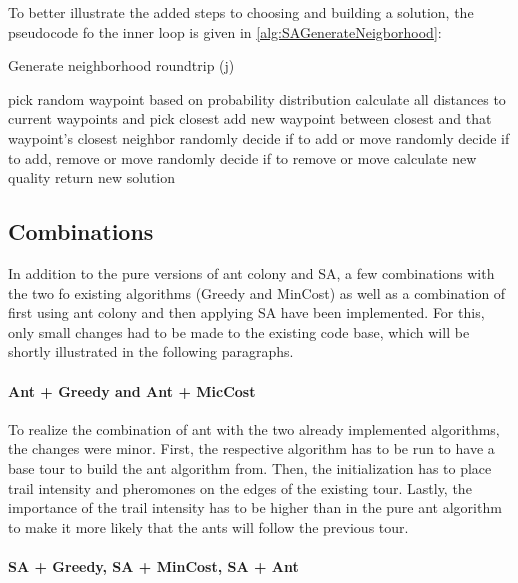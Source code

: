 To better illustrate the added steps to choosing and building a solution, the pseudocode fo the inner loop is given in \ref{alg:SAGenerateNeigborhood}:



\begin{breakablealgorithm}
	\caption{Generate neighborhood roundtrip (j)}
	\label{alg:SAGenerateNeigborhood}
	\begin{algorithmic}[1]
		\STATE pick random waypoint based on probability distribution
		\STATE calculate all distances to current waypoints and pick closest
		\STATE add new waypoint between closest and that waypoint's closest neighbor
		\ELSE {}
		\STATE randomly decide if to add or move
		\ELSE {}
		\STATE randomly decide if to add, remove or move
		\ELSE 
		\STATE randomly decide if to remove or move
		\ENDIF
		\ENDIF
		\ENDIF
		\STATE calculate new quality
		\STATE return new solution
	\end{algorithmic}
\end{breakablealgorithm}


\subsection{Combinations}
\label{subsec:algoCombinations}

In addition to the pure versions of ant colony and SA, a few combinations with the two fo existing algorithms (Greedy and MinCost) as well as a combination of first using ant colony and then applying SA have been implemented.
For this, only small changes had to be made to the existing code base, which will be shortly illustrated in the following paragraphs.

\paragraph{Ant + Greedy and Ant + MicCost}

To realize the combination of ant with the two already implemented algorithms, the changes were minor.
First, the respective algorithm has to be run to have a base tour to build the ant algorithm from.
Then, the initialization has to place trail intensity and pheromones on the edges of the existing tour.
Lastly, the importance of the trail intensity has to be higher than in the pure ant algorithm to make it more likely that the ants will follow the previous tour.


\paragraph{SA + Greedy, SA + MinCost, SA + Ant}

